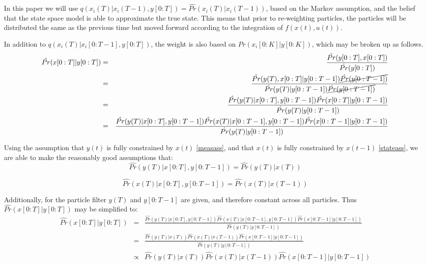 \documentclass{article}
\begin{document}
In this paper we will use 
$q(x_i(T) | x_i(T-1), y[0:T]) =  \hat{Pr}(x_i(T) | x_i(T-1))$,
based on the Markov assumption, and the belief that the state space model is 
able to approximate the true state. This means that prior to re-weighting 
particles, the particles will be distributed the same as the previous time but
moved forward according to the integration of $f(x(t), u(t))$.

In addition to $q(x_i(T) | x_i[0:T-1], y[0:T])$, the weight is also based on $Pr(x_i[0:K] | y[0:K])$,
which may be broken up as follows.
\begin{eqnarray}
\hat{Pr}(x[0:T] | y[0:T]) & = & \frac{\hat{Pr}(y[0:T], x[0:T])}{\hat{Pr}(y[0:T])} \nonumber \\
 & = & \frac{\hat{Pr}(y(T), x[0:T] | y[0:T-1]) \cancel{\hat{Pr}(y[0:T-1])}}{\hat{Pr}(y(T) | y[0:T-1]) \cancel{\hat{Pr}(y[0:T-1])}} \nonumber \\
 & = & \frac{\hat{Pr}(y(T)| x[0:T], y[0:T-1]) \hat{Pr}(x[0:T] | y[0:T-1])}{\hat{Pr}(y(T) | y[0:T-1]) } \nonumber \\
 & = & \frac{\hat{Pr}(y(T)| x[0:T], y[0:T-1]) \hat{Pr}(x(T) | x[0:T-1], y[0:T-1]) \hat{Pr}(x[0:T-1] | y[0:T-1])}{\hat{Pr}(y(T) | y[0:T-1])} \nonumber \\
\end{eqnarray}

Using the assumption that $y(t)$ is fully constrained by $x(t)$ \eqref{measass},
and that $x(t)$ is fully constrained by $x(t-1)$ \eqref{stateass}, we are able to
make the reasonably good assumptions that:
\begin{equation}
\hat{Pr}(y(T) | x[0:T], y[0:T-1]) = \hat{Pr}(y(T) | x(T))
\end{equation}

\begin{equation}
\hat{Pr}(x(T) | x[0:T], y[0:T-1]) = \hat{Pr}(x(T) | x(T-1))
\end{equation}

Additionally, for the particle filter $y(T)$ and $y[0:T-1]$ are 
given, and therefore constant across all particles. Thus $\hat{Pr}(x[0:T] | y[0:T])$
may be simplified to:
\begin{eqnarray}
\hat{Pr}(x[0:T] | y[0:T]) & = & \frac{\hat{Pr}(y(T)| x[0:T], y[0:T-1]) \hat{Pr}(x(T) | x[0:T-1], y[0:T-1]) 
            \hat{Pr}(x[0:T-1] | y[0:T-1])}{\hat{Pr}(y(T) | y[0:T-1])} \nonumber \\
& = & \frac{\hat{Pr}(y(T)| x(T)) \hat{Pr}(x(T) | x(T-1)) \hat{Pr}(x[0:T-1] | y[0:T-1])}{\hat{Pr}(y(T) | y[0:T-1])} \nonumber \\
& \propto & \hat{Pr}(y(T)| x(T)) \hat{Pr}(x(T) | x(T-1)) \hat{Pr}(x[0:T-1] | y[0:T-1])
\end{eqnarray}
\end{document}
